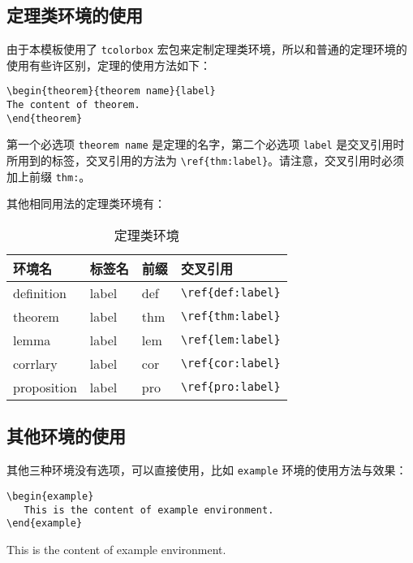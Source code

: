 \documentclass[cn,11pt]{elegantbook}
\begin{document}
\subsection{定理类环境的使用}
由于本模板使用了 \lstinline{tcolorbox} 宏包来定制定理类环境，所以和普通的定理环境的使用有些许区别，定理的使用方法如下：
\begin{lstlisting}
\begin{theorem}{theorem name}{label}
The content of theorem.
\end{theorem}
\end{lstlisting}

第一个必选项 \lstinline{theorem name} 是定理的名字，第二个必选项 \lstinline{label} 是交叉引用时所用到的标签，交叉引用的方法为 \verb|\ref{thm:label}|。请注意，交叉引用时必须加上前缀 \lstinline{thm:}。

其他相同用法的定理类环境有：

\begin{table}[htbp]
   \centering
   \caption{定理类环境}
     \begin{tabular}{llll}
     \toprule
     环境名 & 标签名 & 前缀 & 交叉引用 \\
     \midrule
     definition & label & def   & \lstinline|\ref{def:label}| \\
     theorem & label & thm   & \lstinline|\ref{thm:label}| \\
     lemma & label & lem   & \lstinline|\ref{lem:label}| \\
     corrlary & label & cor   & \lstinline|\ref{cor:label}| \\
     proposition & label & pro   & \lstinline|\ref{pro:label}| \\
     \bottomrule
     \end{tabular}%
   \label{tab:theorem-class}%
 \end{table}%
 

\subsection{其他环境的使用}
其他三种环境没有选项，可以直接使用，比如 \lstinline{example} 环境的使用方法与效果：
\begin{lstlisting}
\begin{example}
   This is the content of example environment.
\end{example}
\end{lstlisting}

\begin{example}
This is the content of example environment.
\end{example}
\end{document}
